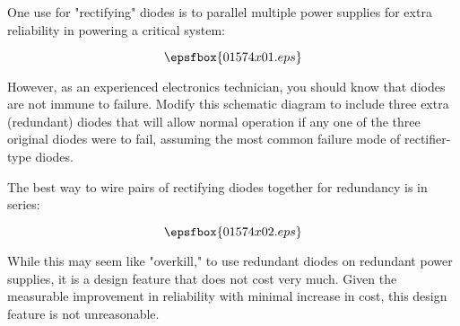

One use for "rectifying" diodes is to parallel multiple power supplies for extra reliability in powering a critical system:

$$\epsfbox{01574x01.eps}$$

However, as an experienced electronics technician, you should know that diodes are not immune to failure.  Modify this schematic diagram to include three extra (redundant) diodes that will allow normal operation if any one of the three original diodes were to fail, assuming the most common failure mode of rectifier-type diodes.







The best way to wire pairs of rectifying diodes together for redundancy is in series:

$$\epsfbox{01574x02.eps}$$







While this may seem like "overkill," to use redundant diodes on redundant power supplies, it is a design feature that does not cost very much.  Given the measurable improvement in reliability with minimal increase in cost, this design feature is not unreasonable.




